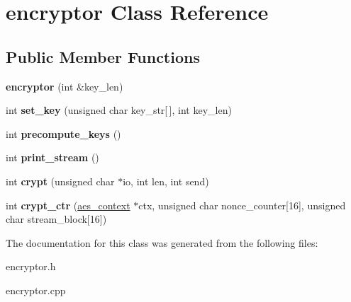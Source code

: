 \hypertarget{classencryptor}{
\section{encryptor Class Reference}
\label{classencryptor}
}
\subsection*{Public Member Functions}
\begin{DoxyCompactItemize}
\item 
\hypertarget{classencryptor_a1f3a28882c87debdd623e261455405db}{
{\bfseries encryptor} (int \&key\_\-len)}
\label{classencryptor_a1f3a28882c87debdd623e261455405db}

\item 
\hypertarget{classencryptor_afe7ad3b00eddca9074937f7c3f89735e}{
int {\bfseries set\_\-key} (unsigned char key\_\-str\mbox{[}$\,$\mbox{]}, int key\_\-len)}
\label{classencryptor_afe7ad3b00eddca9074937f7c3f89735e}

\item 
\hypertarget{classencryptor_ae0aa6152765970df0429edeec571afc4}{
int {\bfseries precompute\_\-keys} ()}
\label{classencryptor_ae0aa6152765970df0429edeec571afc4}

\item 
\hypertarget{classencryptor_a1f6a4369d7caf957f0145bbe2b488cfb}{
int {\bfseries print\_\-stream} ()}
\label{classencryptor_a1f6a4369d7caf957f0145bbe2b488cfb}

\item 
\hypertarget{classencryptor_a9ba215655cd9e634a1dc155743dc049d}{
int {\bfseries crypt} (unsigned char $\ast$io, int len, int send)}
\label{classencryptor_a9ba215655cd9e634a1dc155743dc049d}

\item 
\hypertarget{classencryptor_a23ba22a54e60e12b3fd6964f89122f61}{
int {\bfseries crypt\_\-ctr} (\hyperlink{structaes__context}{aes\_\-context} $\ast$ctx, unsigned char nonce\_\-counter\mbox{[}16\mbox{]}, unsigned char stream\_\-block\mbox{[}16\mbox{]})}
\label{classencryptor_a23ba22a54e60e12b3fd6964f89122f61}

\end{DoxyCompactItemize}


The documentation for this class was generated from the following files:\begin{DoxyCompactItemize}
\item 
encryptor.h\item 
encryptor.cpp\end{DoxyCompactItemize}

